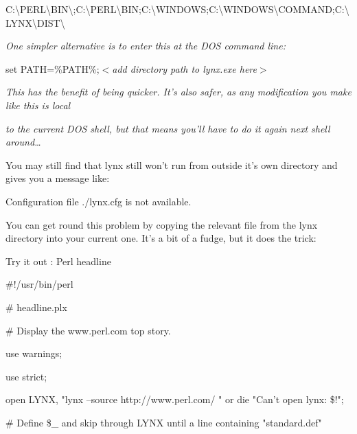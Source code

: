 \documentclass[a4paper,11pt]{book}
\begin{document}
\noindent C:\textbackslash PERL\textbackslash BIN\textbackslash ;C:\textbackslash PERL\textbackslash BIN;C:\textbackslash WINDOWS;C:\textbackslash WINDOWS\textbackslash COMMAND;C:\textbackslash LYNX\textbackslash DIST\textbackslash 

\noindent 

\noindent 

\noindent \textit{One simpler alternative is to enter this at the DOS command line:}

\noindent 

\noindent set PATH=\%PATH\%;\textit{$<$add directory path to lynx.exe here$>$}

\noindent 

\noindent \textit{This has the benefit of being quicker. It's also safer, as any modification you make like this is local}

\noindent \textit{to the current DOS shell, but that means you'll have to do it again next shell around\dots }

\noindent 

\noindent 

\noindent You may still find that lynx still won't run from outside it's own directory and gives you a message like:

\noindent 

\noindent Configuration file ./lynx.cfg is not available.

\noindent 

\noindent You can get round this problem by copying the relevant file from the lynx directory into your current one. It's a bit of a fudge, but it does the trick:

\noindent 

\noindent 

\noindent Try it out : Perl headline

\noindent 

\noindent 

\noindent \#!/usr/bin/perl

\noindent \# headline.plx

\noindent \# Display the www.perl.com top story.

\noindent use warnings;

\noindent use strict;

\noindent 

\noindent open LYNX, "lynx --source http://www.perl.com/ \textbar " or die "Can't open lynx: \$!";

\noindent 

\noindent \# Define \$\_  and skip through LYNX until a line containing "standard.def"
\end{document}
